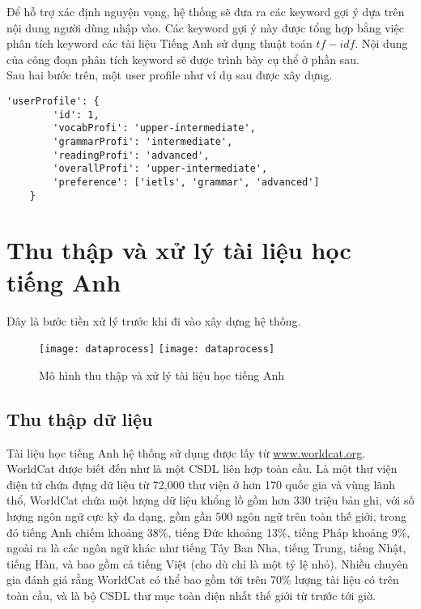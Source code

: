  Để hỗ trợ xác định nguyện vọng, hệ thống sẽ đưa ra các keyword gợi ý dựa trên nội dung người dùng nhập vào. Các keyword gợi ý này được tổng hợp bằng việc phân tích keyword các tài liệu Tiếng Anh sử dụng thuật toán $tf-idf$. Nội dung của công đoạn phân tích keyword sẽ được trình bày cụ thể ở phần sau.\\
 
Sau hai bước trên, một user profile như ví dụ sau được xây dựng.

\begin{lstlisting}[style=pythoncode]
'userProfile': {
        'id': 1,
        'vocabProfi': 'upper-intermediate',
        'grammarProfi': 'intermediate',
        'readingProfi': 'advanced',
        'overallProfi': 'upper-intermediate',
        'preference': ['ietls', 'grammar', 'advanced']
    }
\end{lstlisting}
\section{Thu thập và xử lý tài liệu học tiếng Anh}

Đây là bước tiền xử lý trước khi đi vào xây dựng hệ thống.

\begin{figure}[H]
  \begin{center}
    \ifpdf
      \texttt{[image: dataprocess]}
    \else
      \texttt{[image: dataprocess]}
    \fi
    \caption{Mô hình thu thập và xử lý tài liệu học tiếng Anh}
    \label{DataProcess}
  \end{center}
\end{figure}

\subsection{Thu thập dữ liệu}

Tài liệu học tiếng Anh hệ thống sử dụng được lấy từ \:\url{www.worldcat.org}\:. WorldCat được biết đến như là một CSDL liên hợp toàn cầu. Là một thư viện điện tử chứa đựng dữ liệu từ 72,000 thư viện ở hơn 170 quốc gia và vùng lãnh thổ, WorldCat chứa một lượng dữ liệu khổng lồ gồm hơn 330 triệu bản ghi, với số lượng ngôn ngữ cực kỳ đa dạng, gồm gần 500 ngôn ngữ trên toàn thế giới, trong đó tiếng Anh chiếm khoảng 38\%, tiếng Đức khoảng 13\%, tiếng Pháp khoảng 9\%, ngoài ra là các ngôn ngữ khác như tiếng Tây Ban Nha, tiếng Trung, tiếng Nhật, tiếng Hàn, và bao gồm cả tiếng Việt (cho dù chỉ là một tỷ lệ nhỏ). Nhiều chuyên gia đánh giá rằng WorldCat có thể bao gồm tới trên 70\% lượng tài liệu có trên toàn cầu, và là bộ CSDL thư mục toàn diện nhất thế giới từ trước tới giờ.

